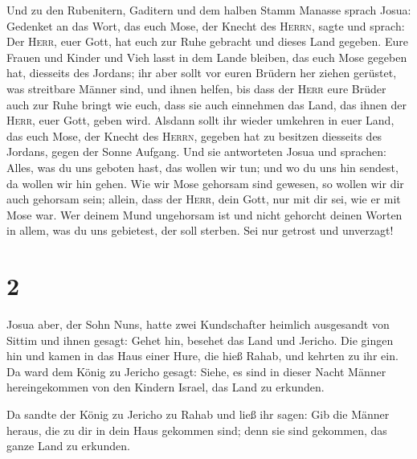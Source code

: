  Und zu den Rubenitern, Gaditern und dem halben Stamm
Manasse sprach Josua:  Gedenket an das Wort, das euch
Mose, der Knecht des \textsc{Herrn}, sagte und sprach: Der
\textsc{Herr}, euer Gott, hat euch zur Ruhe gebracht und dieses Land
gegeben.  Eure Frauen und Kinder und Vieh lasst in dem
Lande bleiben, das euch Mose gegeben hat, diesseits des Jordans; ihr
aber sollt vor euren Brüdern her ziehen gerüstet, was streitbare Männer
sind, und ihnen helfen,  bis dass der \textsc{Herr} eure
Brüder auch zur Ruhe bringt wie euch, dass sie auch einnehmen das Land,
das ihnen der \textsc{Herr}, euer Gott, geben wird. Alsdann sollt ihr
wieder umkehren in euer Land, das euch Mose, der Knecht des
\textsc{Herrn}, gegeben hat zu besitzen diesseits des Jordans, gegen der
Sonne Aufgang.  Und sie antworteten Josua und sprachen:
Alles, was du uns geboten hast, das wollen wir tun; und wo du uns hin
sendest, da wollen wir hin gehen.  Wie wir Mose gehorsam
sind gewesen, so wollen wir dir auch gehorsam sein; allein, dass der
\textsc{Herr}, dein Gott, nur mit dir sei, wie er mit Mose war.
 Wer deinem Mund ungehorsam ist und nicht gehorcht deinen
Worten in allem, was du uns gebietest, der soll sterben. Sei nur getrost
und unverzagt!

\hypertarget{section-1}{%
\section{2}\label{section-1}}

 Josua aber, der Sohn Nuns, hatte zwei Kundschafter
heimlich ausgesandt von Sittim und ihnen gesagt: Gehet hin, besehet das
Land und Jericho. Die gingen hin und kamen in das Haus einer Hure, die
hieß Rahab, und kehrten zu ihr ein.  Da ward dem König zu
Jericho gesagt: Siehe, es sind in dieser Nacht Männer hereingekommen von
den Kindern Israel, das Land zu erkunden.

 Da sandte der König zu Jericho zu Rahab und ließ ihr
sagen: Gib die Männer heraus, die zu dir in dein Haus gekommen sind;
denn sie sind gekommen, das ganze Land zu erkunden.

